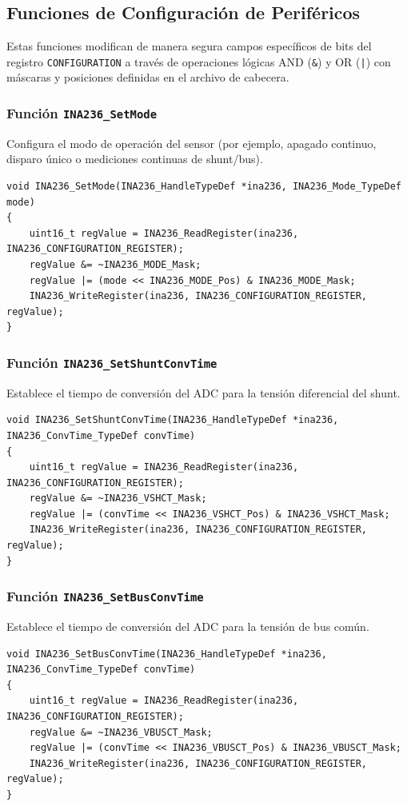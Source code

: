 \documentclass[
10pt, %
a4paper, %
oneside, %
headinclude,footinclude, %
BCOR5mm, %
]{scrartcl}
\begin{document}
\subsection{Funciones de Configuración de Periféricos}
Estas funciones modifican de manera segura campos específicos de bits del registro \texttt{CONFIGURATION} a través de operaciones lógicas AND (\texttt{\&}) y OR (\texttt{|}) con máscaras y posiciones definidas en el archivo de cabecera.

\subsubsection{Función \texttt{INA236\_SetMode}}
Configura el modo de operación del sensor (por ejemplo, apagado continuo, disparo único o mediciones continuas de shunt/bus).
\begin{lstlisting}[style=CMakeStyle]
void INA236_SetMode(INA236_HandleTypeDef *ina236, INA236_Mode_TypeDef mode)
{
    uint16_t regValue = INA236_ReadRegister(ina236, INA236_CONFIGURATION_REGISTER);
    regValue &= ~INA236_MODE_Mask;
    regValue |= (mode << INA236_MODE_Pos) & INA236_MODE_Mask;
    INA236_WriteRegister(ina236, INA236_CONFIGURATION_REGISTER, regValue);
}
\end{lstlisting}

\subsubsection{Función \texttt{INA236\_SetShuntConvTime}}
Establece el tiempo de conversión del ADC para la tensión diferencial del shunt.
\begin{lstlisting}[style=CMakeStyle]
void INA236_SetShuntConvTime(INA236_HandleTypeDef *ina236, INA236_ConvTime_TypeDef convTime)
{
    uint16_t regValue = INA236_ReadRegister(ina236, INA236_CONFIGURATION_REGISTER);
    regValue &= ~INA236_VSHCT_Mask;
    regValue |= (convTime << INA236_VSHCT_Pos) & INA236_VSHCT_Mask;
    INA236_WriteRegister(ina236, INA236_CONFIGURATION_REGISTER, regValue);
}
\end{lstlisting}

\subsubsection{Función \texttt{INA236\_SetBusConvTime}}
Establece el tiempo de conversión del ADC para la tensión de bus común.
\begin{lstlisting}[style=CMakeStyle]
void INA236_SetBusConvTime(INA236_HandleTypeDef *ina236, INA236_ConvTime_TypeDef convTime)
{
    uint16_t regValue = INA236_ReadRegister(ina236, INA236_CONFIGURATION_REGISTER);
    regValue &= ~INA236_VBUSCT_Mask;
    regValue |= (convTime << INA236_VBUSCT_Pos) & INA236_VBUSCT_Mask;
    INA236_WriteRegister(ina236, INA236_CONFIGURATION_REGISTER, regValue);
}
\end{lstlisting}
\end{document}
